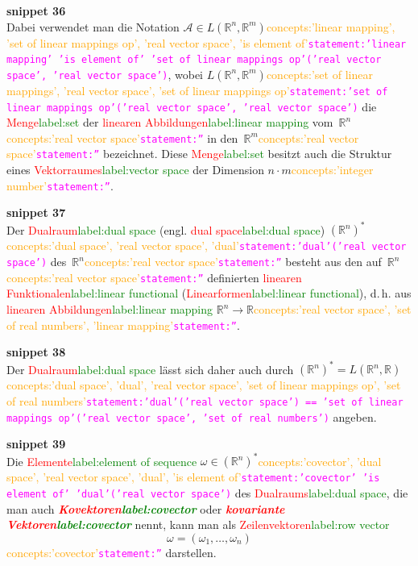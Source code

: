 \documentclass[a4paper,twoside,english,ngerman,deutsch,german,sectrefs,envcountsame,envcountchap]{svmono}
\newcommand{\setref}[2]{\textcolor{red}{#1}\textcolor{green}{#2}}
\newcommand{\snippet}[1]{\textbf{snippet #1}\\}
\newcommand{\eqnote}[2]{\textcolor{orange}{#1}\textcolor{magenta}{\texttt{#2}}}
\begin{document}
\snippet{36}
Dabei verwendet man die Notation $\mathcal{A}\in L({\mathbb{R}}^{n},{\mathbb{R}}^{m})$\eqnote{concepts:'linear mapping', 'set of linear mappings op', 'real vector space', 'is element of'}{statement:'linear mapping' 'is element of' 'set of linear mappings op'('real vector space', 'real vector space')}, wobei $L({\mathbb{R}}^{n},{\mathbb{R}}^{m})$\eqnote{concepts:'set of linear mappings', 'real vector space', 'set of linear mappings op'}{statement:'set of linear mappings op'('real vector space', 'real vector space')} die \setref{Menge}{label:set} der \setref{linearen Abbildungen}{label:linear mapping} vom~${\mathbb{R}}^{n}$\eqnote{concepts:'real vector space'}{statement:''} in den~${\mathbb{R}}^{m}$\eqnote{concepts:'real vector space'}{statement:''} bezeichnet. Diese \setref{Menge}{label:set} besitzt auch die Struktur eines \setref{Vektorraumes}{label:vector space} der Dimension $n\cdot m$\eqnote{concepts:'integer number'}{statement:''}.

\snippet{37}
Der \setref{Dualraum}{label:dual space} (engl. \setref{dual space}{label:dual space}) $({\mathbb{R}}^{n})^{*}$\eqnote{concepts:'dual space', 'real vector space', 'dual'}{statement:'dual'('real vector space')} des~${\mathbb{R}}^{n}$\eqnote{concepts:'real vector space'}{statement:''} besteht aus den auf~${\mathbb{R}}^{n}$\eqnote{concepts:'real vector space'}{statement:''} definierten \setref{linearen Funktionalen}{label:linear functional} (\setref{Linearformen}{label:linear functional}), d.\,h. aus \setref{linearen Abbildungen}{label:linear mapping} ${\mathbb{R}}^{n}\to{\mathbb{R}}$\eqnote{concepts:'real vector space', 'set of real numbers', 'linear mapping'}{statement:''}.

\snippet{38}
Der \setref{Dualraum}{label:dual space} lässt sich daher auch durch $({\mathbb{R}}^{n})^{*}=L({\mathbb{R}}^{n},{\mathbb{R}})$\eqnote{concepts:'dual space', 'dual', 'real vector space', 'set of linear mappings op', 'set of real numbers'}{statement:'dual'('real vector space') == 'set of linear mappings op'('real vector space', 'set of real numbers')} angeben.

\snippet{39}
Die \setref{Elemente}{label:element of sequence} $\omega\in({\mathbb{R}}^{n})^{*}$\eqnote{concepts:'covector', 'dual space', 'real vector space', 'dual', 'is element of'}{statement:'covector' 'is element of' 'dual'('real vector space')} des \setref{Dualraums}{label:dual space}, die man auch \textbf{\em \setref{Kovektoren}{label:covector}} oder \textbf{\em \setref{kovariante Vektoren}{label:covector}} nennt, kann man als \setref{Zeilenvektoren}{label:row vector}
\[
\omega=\left(\omega_{1},\ldots,\omega_{n}\right)
\]\eqnote{concepts:'covector'}{statement:''}
darstellen.
\end{document}
